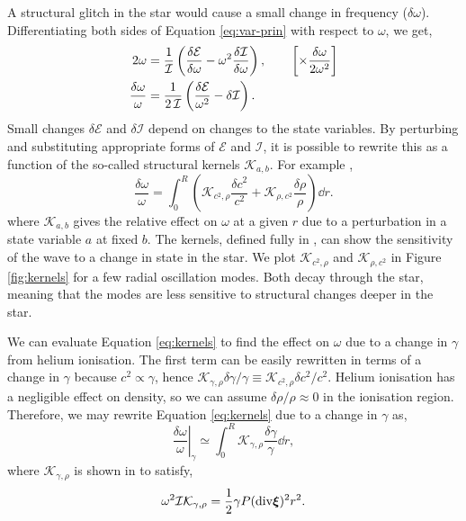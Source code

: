 A structural glitch in the star would cause a small change in frequency (\(\delta\omega\)). Differentiating both sides of Equation \ref{eq:var-prin} with respect to \(\omega\), we get,
%
\begin{align}
    2\omega &= \frac{1}{\mathcal{I}} \left( \frac{\delta\mathcal{E}}{\delta\omega} - \omega^2 \frac{\delta\mathcal{I}}{\delta\omega}\right), \qquad \left[\times \frac{\delta\omega}{2\omega^2}\right] \notag \\
    \frac{\delta\omega}{\omega} &= \frac{1}{2\,\mathcal{I}} \left(\frac{\delta\mathcal{E}}{\omega^2} - \delta\mathcal{I}\right).
\end{align}
%
Small changes \(\delta\mathcal{E}\) and \(\delta\mathcal{I}\) depend on changes to the state variables. By perturbing and substituting appropriate forms of \(\mathcal{E}\) and \(\mathcal{I}\), it is possible to rewrite this as a function of the so-called structural kernels \(\mathcal{K}_{a,b}\). For example \citep{Christensen-Dalsgaard2014},
%
\begin{equation}
    \frac{\delta\omega}{\omega} = \int_0^R \left(\mathcal{K}_{c^2,\rho} \frac{\delta c^2}{c^2} + \mathcal{K}_{\rho,c^2} \frac{\delta \rho}{\rho} \right) \dd r.\label{eq:kernels}
\end{equation}
%
where \(\mathcal{K}_{a, b}\) gives the relative effect on \(\omega\) at a given \(r\) due to a perturbation in a state variable \(a\) at fixed \(b\). The kernels, defined fully in \citet{Gough.Thompson1991}, can show the sensitivity of the wave to a change in state in the star. We plot \(\mathcal{K}_{c^2,\rho}\) and \(\mathcal{K}_{\rho,c^2}\) in Figure \ref{fig:kernels} for a few radial oscillation modes. Both decay through the star, meaning that the modes are less sensitive to structural changes deeper in the star.

We can evaluate Equation \ref{eq:kernels} to find the effect on \(\omega\) due to a change in \(\gamma\) from helium ionisation. The first term can be easily rewritten in terms of a change in \(\gamma\) because \(c^2 \propto \gamma\), hence \(\mathcal{K}_{\gamma,\rho} \delta \gamma / \gamma \equiv \mathcal{K}_{c^2,\rho} \delta c^2 / c^2\). Helium ionisation has a negligible effect on density, so we can assume \(\delta\rho/\rho \approx 0\) in the ionisation region. Therefore, we may rewrite Equation \ref{eq:kernels} due to a change in \(\gamma\) as,
%
\begin{equation}
    \left.\frac{\delta\omega}{\omega}\right|_\gamma \simeq \int_0^R \mathcal{K}_{\gamma,\rho} \frac{\delta\gamma}{\gamma} \dd r,\label{eq:delta-omega}
\end{equation}
%
where \(\mathcal{K}_{\gamma,\rho}\) is shown in \citet{Gough1993} to satisfy,
%
\begin{equation}
    \omega^2 \mathcal{I}\mathcal{K}_{\gamma,\rho} = \frac12 \gamma P (\mathrm{div} \bm{\xi})^2 r^2.\label{eq:gamma-kernel}
\end{equation}
%

